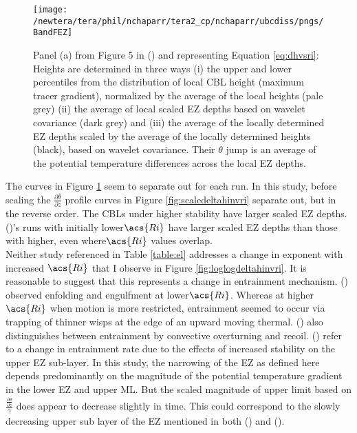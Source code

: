 \begin{figure}[htbp]
    \centering
    \texttt{[image: /newtera/tera/phil/nchaparr/tera2\_cp/nchaparr/ubcdiss/pngs/BandFEZ]}
    \caption[Relationship of Scaled \acs{EZ} depth to Richardson number from \citeauthor{BrooksFowler2}'s (\citeyear{BrooksFowler2})]{Panel (a) from Figure 5 in \citeauthor{BrooksFowler2} (\citeyear{BrooksFowler2}) and representing Equation \ref{eq:dhvsri}: Heights are determined in three ways (i) the upper and lower percentiles from the distribution of local \acs{CBL} height (maximum tracer gradient), normalized by the average of the local heights (pale grey) (ii) the average of local scaled \acs{EZ} depths based on wavelet covariance (dark grey) and (iii) the average of the locally determined \acs{EZ} depths scaled by the average of the locally determined heights (black), based on wavelet covariance.  Their $\theta$ jump is an average of the potential temperature differences across the local \acs{EZ} depths.}
    \label{fig:BandFEZ}   %
\end{figure}

The curves in Figure \ref{fig:BandFEZ} seem to separate out for each run.  In this study, before scaling the $\frac{\partial \overline{\theta}}{\partial z}$ profile curves in Figure \ref{fig:scaledeltahinvri} separate out, but in the reverse order.  The \acs{CBL}s under higher stability have larger scaled \acs{EZ} depths.  \citeauthor{BrooksFowler2} (\citeyear{BrooksFowler2})'s runs with initially lower$\acs{Ri}$ have larger scaled \acs{EZ} depths than those with higher, even where$\acs{Ri}$ values overlap.\\     

Neither study referenced in Table \ref{table:el} addresses a change in exponent with increased $\acs{Ri}$ that I observe in Figure \ref{fig:loglogdeltahinvri}.  It is reasonable to suggest that this represents a change in entrainment mechanism. \citeauthor{SullMoengStev} (\citeyear{SullMoengStev}) observed enfolding and engulfment at lower$\acs{Ri}$.  Whereas at higher$\acs{Ri}$ when motion is more restricted, entrainment seemed to occur via trapping of thinner wisps at the edge of an upward moving thermal.  \citeauthor{Turner86} (\citeyear{Turner86}) also distinguishes between entrainment by convective overturning and recoil. \citeauthor{GarciaMellado} (\citeyear{GarciaMellado}) refer to a change in entrainment rate due to the effects of increased stability on the upper \acs{EZ} sub-layer.  In this study, the narrowing of the \acs{EZ} as defined here depends predominantly on the magnitude of the potential temperature gradient in the lower \acs{EZ} and upper \acs{ML}.  But the scaled magnitude of upper limit based on $\frac{\frac{\partial \overline{\theta}}{\partial z}}{\gamma}$ does appear to decrease slightly in time.  This could correspond to the slowly decreasing upper sub layer of the \acs{EZ} mentioned in both \citeauthor{GarciaMellado} (\citeyear{GarciaMellado}) and \citeauthor{FedConzMir04} (\citeyear{FedConzMir04}).\\

